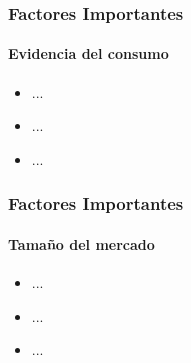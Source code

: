 \begin{frame}
\frametitle{Factores Importantes}
\framesubtitle{Evidencia del consumo}

\begin{itemize}
	\item<1-> ...
	\item<2-> ...
	\item<3-> ...
\end{itemize}
\end{frame}

\begin{frame}
\frametitle{Factores Importantes}
\framesubtitle{Tamaño del mercado}

\begin{itemize}
	\item<1-> ...
	\item<2-> ...
	\item<3-> ...
\end{itemize}
\end{frame}

